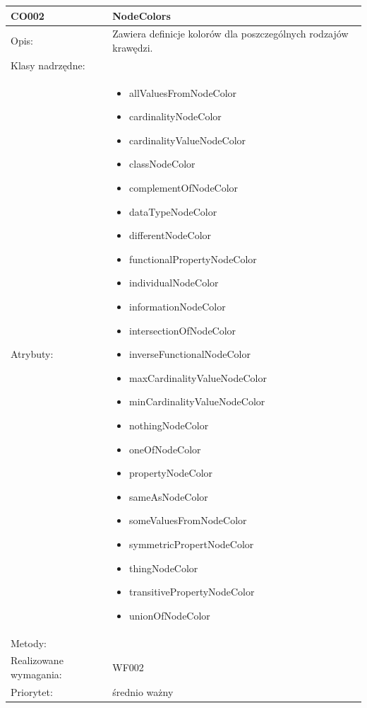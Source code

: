 \documentclass[a4paper,10pt]{article}
\begin{document}
\begin{center}
\begin{longtable}{|m{3cm}|m{9cm}|}
CO002 & NodeColors \\ \hline
Opis: & Zawiera definicje kolorów dla poszczególnych rodzajów krawędzi.   \\ \hline
Klasy nadrzędne: &     \\ \hline
Atrybuty: & \begin{itemize}
 \item allValuesFromNodeColor
 \item cardinalityNodeColor
 \item cardinalityValueNodeColor
 \item classNodeColor
 \item complementOfNodeColor
 \item dataTypeNodeColor
 \item differentNodeColor
 \item functionalPropertyNodeColor
 \item individualNodeColor
 \item informationNodeColor
 \item intersectionOfNodeColor
 \item inverseFunctionalNodeColor
 \item maxCardinalityValueNodeColor
 \item minCardinalityValueNodeColor
 \item nothingNodeColor
 \item oneOfNodeColor
 \item propertyNodeColor
 \item sameAsNodeColor
 \item someValuesFromNodeColor
 \item symmetricPropertNodeColor
 \item thingNodeColor
 \item transitivePropertyNodeColor
 \item unionOfNodeColor 
\end{itemize}
 \\ \hline
Metody: & %
  \\ \hline
Realizowane wymagania: & WF002 \\ \hline
Priorytet: & średnio ważny \\ \hline


\end{longtable}


\end{center}
\end{document}
